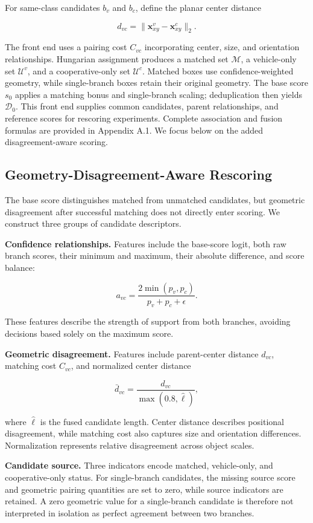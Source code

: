 For same-class candidates $b_v$ and $b_c$, define the planar center distance

\[
d_{vc}=\|\mathbf x^v_{xy}-\mathbf x^c_{xy}\|_2.
\]

The front end uses a pairing cost $C_{vc}$ incorporating center, size, and orientation relationships. Hungarian assignment produces a matched set $\mathcal M$, a vehicle-only set $\mathcal U^v$, and a cooperative-only set $\mathcal U^c$. Matched boxes use confidence-weighted geometry, while single-branch boxes retain their original geometry. The base score $s_0$ applies a matching bonus and single-branch scaling; deduplication then yields $\mathcal D_0$. This front end supplies common candidates, parent relationships, and reference scores for rescoring experiments. Complete association and fusion formulas are provided in Appendix A.1. We focus below on the added disagreement-aware scoring.

\subsection{Geometry-Disagreement-Aware Rescoring}

The base score distinguishes matched from unmatched candidates, but geometric disagreement after successful matching does not directly enter scoring. We construct three groups of candidate descriptors.

\textbf{Confidence relationships.} Features include the base-score logit, both raw branch scores, their minimum and maximum, their absolute difference, and score balance:

\[
a_{vc}=\frac{2\min(p_v,p_c)}{p_v+p_c+\epsilon}.
\]

These features describe the strength of support from both branches, avoiding decisions based solely on the maximum score.

\textbf{Geometric disagreement.} Features include parent-center distance $d_{vc}$, matching cost $C_{vc}$, and normalized center distance

\[
\bar d_{vc}=\frac{d_{vc}}{\max(0.8,\hat\ell)},
\]

where $\hat\ell$ is the fused candidate length. Center distance describes positional disagreement, while matching cost also captures size and orientation differences. Normalization represents relative disagreement across object scales.

\textbf{Candidate source.} Three indicators encode matched, vehicle-only, and cooperative-only status. For single-branch candidates, the missing source score and geometric pairing quantities are set to zero, while source indicators are retained. A zero geometric value for a single-branch candidate is therefore not interpreted in isolation as perfect agreement between two branches.

